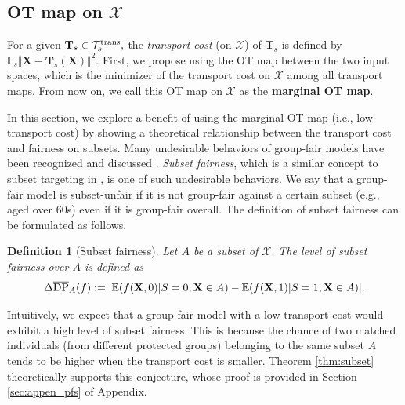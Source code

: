 \documentclass[10pt]{article} %
\newtheorem{definition}[theorem]{Definition}
\begin{document}
\subsection{OT map on $\mathcal{X}$}\label{sec:choiceT-OT}

For a given $\mathbf{T}_{s} \in \mathcal{T}_{s}^{\textup{trans}},$ the \textit{transport cost} (on $\mathcal{X}$) of $\mathbf{T}_{s}$ is defined by $\mathbb{E}_{s} \Vert \mathbf{X} - \mathbf{T}_{s}(\mathbf{X}) \Vert^{2}.$
First, we propose using the OT map between the two input spaces, which is the minimizer of the transport cost on $\mathcal{X}$ among all transport maps.
From now on, we call this OT map on $\mathcal{X}$ as the \textbf{marginal OT map}.

In this section, we explore a benefit of using the marginal OT map (i.e., low transport cost) by showing a theoretical relationship between the transport cost and fairness on subsets.
Many undesirable behaviors of group-fair models have been recognized and discussed \citep{10.1145/2090236.2090255, kearns2018empirical, wachter2020bias, mougan2024beyond}.
\textit{Subset fairness}, which is a similar concept to subset targeting in \citet{10.1145/2090236.2090255}, is one of such undesirable behaviors. 
We say that a group-fair model is subset-unfair if it is not group-fair against a certain subset (e.g., aged over 60s) even if it is group-fair overall.
The definition of subset fairness can be formulated as follows.

\begin{definition}[Subset fairness]\label{def:subsetfairness}
    Let $A$ be a subset of $\mathcal{X}.$
    The level of \textit{subset fairness} over $A$ is defined as
    $$
    \Delta \overline{\textup{DP}}_{A}(f) := \vert \mathbb{E} ( f( \mathbf{X}, 0 ) | S = 0, \mathbf{X} \in A ) - \mathbb{E} ( f( \mathbf{X}, 1 ) | S = 1, \mathbf{X} \in A ) \vert.
    $$
\end{definition}

Intuitively, we expect that a group-fair model with a low transport cost would exhibit a high level of subset fairness.
This is because the chance of two matched individuals (from different protected groups) belonging to the same subset $A$ tends to be higher when the transport cost is smaller.
Theorem \ref{thm:subset} theoretically supports this conjecture, whose proof is provided in Section \ref{sec:appen_pfs} of Appendix.
\end{document}
